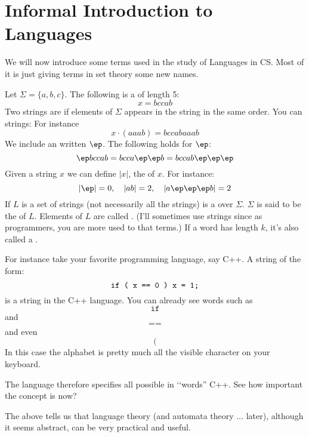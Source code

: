 \section{Informal Introduction to Languages}

We will now introduce some terms used in the study of Languages in
CS. Most of it is just giving terms in set theory some new names.

Let $\Sigma = \{a,b,c\}$. The following is a  of
length 5:
\[ x = bccab \]
Two strings are  if elements of $\Sigma$ appears in the
string in the same order. You can  strings: For
instance
\[ x \cdot (aaab) = bccabaaab \]
We include an  written $\ep$. The following
holds for $\ep$:
\[ \ep bccab = bcca\ep\ep b = bccab\ep\ep\ep \]
Given a string $x$ we can define $|x|$, the  of $x$.
For instance:
\[
  |\ep| = 0, \quad |ab| = 2, \quad |a\ep\ep\ep b| = 2
\]
If $L$ is a set of strings (not necessarily all the strings) is a
 over $\Sigma$. $\Sigma$ is said to be the
 of
$L$.
Elements of $L$ are called .
(I'll sometimes use strings since as programmers, you are more used to that terms.)
If a word has
length $k$, it's also called a .

For instance take your favorite programming language, say C++. A
string of the form:
\[
\text{\texttt{ if ( x == 0 ) x = 1; }}
\]
is a string in the C++ language.
You can already see words such as
\[
\texttt{if}
\]
and
\[
\texttt{==}
\]
and even
\[
\texttt{(}
\]
In this case the alphabet is pretty much all the
visible character on your keyboard.

The language therefore specifies all possible in \lq\lq words''
C++.
See how important the concept is now?

The above tells us that language theory (and automata theory ... later),
although it seems abstract, can be very practical and useful.

